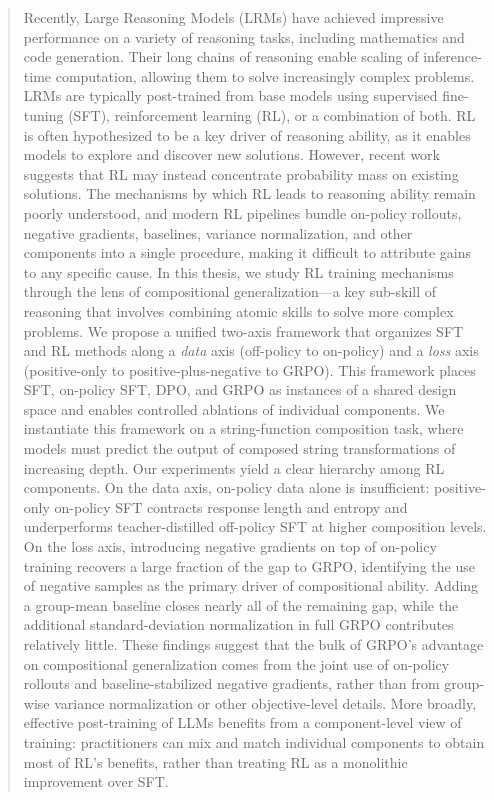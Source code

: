\documentclass[12pt]{cmuthesis}
\begin{document}
\begin{abstract}
Recently, Large Reasoning Models (LRMs) have achieved impressive performance on a variety of reasoning tasks, including mathematics and code generation. Their long chains of reasoning enable scaling of inference-time computation, allowing them to solve increasingly complex problems. LRMs are typically post-trained from base models using supervised fine-tuning (SFT), reinforcement learning (RL), or a combination of both. RL is often hypothesized to be a key driver of reasoning ability, as it enables models to explore and discover new solutions. However, recent work suggests that RL may instead concentrate probability mass on existing solutions.
The mechanisms by which RL leads to reasoning ability remain poorly understood, and modern RL pipelines bundle on-policy rollouts, negative gradients, baselines, variance normalization, and other components into a single procedure, making it difficult to attribute gains to any specific cause. In this thesis, we study RL training mechanisms through the lens of compositional generalization---a key sub-skill of reasoning that involves combining atomic skills to solve more complex problems.
We propose a unified two-axis framework that organizes SFT and RL methods along a \emph{data} axis (off-policy to on-policy) and a \emph{loss} axis (positive-only to positive-plus-negative to GRPO). This framework places SFT, on-policy SFT, DPO, and GRPO as instances of a shared design space and enables controlled ablations of individual components. We instantiate this framework on a string-function composition task, where models must predict the output of composed string transformations of increasing depth.
Our experiments yield a clear hierarchy among RL components. On the data axis, on-policy data alone is insufficient: positive-only on-policy SFT contracts response length and entropy and underperforms teacher-distilled off-policy SFT at higher composition levels. On the loss axis, introducing negative gradients on top of on-policy training recovers a large fraction of the gap to GRPO, identifying the use of negative samples as the primary driver of compositional ability. Adding a group-mean baseline closes nearly all of the remaining gap, while the additional standard-deviation normalization in full GRPO contributes relatively little.
These findings suggest that the bulk of GRPO's advantage on compositional generalization comes from the joint use of on-policy rollouts and baseline-stabilized negative gradients, rather than from group-wise variance normalization or other objective-level details. More broadly, effective post-training of LLMs benefits from a component-level view of training: practitioners can mix and match individual components to obtain most of RL's benefits, rather than treating RL as a monolithic improvement over SFT.
\end{abstract}
\end{document}
